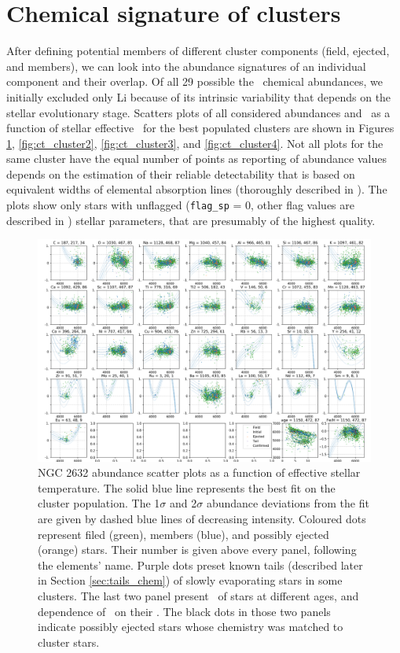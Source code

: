 \section{Chemical signature of clusters}
\label{sec:chem_cluster}
After defining potential members of different cluster components (field, ejected, and members), we can look into the abundance signatures of an individual component and their overlap. Of all 29 possible the \Gh\ chemical abundances, we initially excluded only Li because of its intrinsic variability that depends on the stellar evolutionary stage. Scatters plots of all considered abundances and \Feh\ as a function of stellar effective \Teff\ for the best populated clusters are shown in Figures \ref{fig:ct_cluster1}, \ref{fig:ct_cluster2}, \ref{fig:ct_cluster3}, and \ref{fig:ct_cluster4}. Not all plots for the same cluster have the equal number of points as reporting of abundance values depends on the estimation of their reliable detectability that is based on equivalent widths of elemental absorption lines (thoroughly described in \citet{buder2020}). The plots show only stars with unflagged (\texttt{flag\_sp} = 0, other flag values are described in \citet{buder2020}) stellar parameters, that are presumably of the highest quality.

\begin{figure}
	\centering
	\includegraphics[width=\textwidth]{p_teff_abundances_NGC_2682_orbits_DR3_new_flag0.png}
	\caption{NGC 2632 abundance scatter plots as a function of effective stellar temperature. The solid blue line represents the best fit on the cluster population. The 1$\sigma$ and 2$\sigma$ abundance deviations from the fit are given by dashed blue lines of decreasing intensity. Coloured dots represent filed (green), members (blue), and possibly ejected (orange) stars. Their number is given above every panel, following the elements' name. Purple dots preset known tails (described later in Section \ref{sec:tails_chem}) of slowly evaporating stars in some clusters. The last two panel present \Teff\ of stars at different ages, and dependence of \Feh\ on their \Teff. The black dots in those two panels indicate possibly ejected stars whose chemistry was matched to cluster stars.}
	\label{fig:ct_cluster1}
\end{figure}


